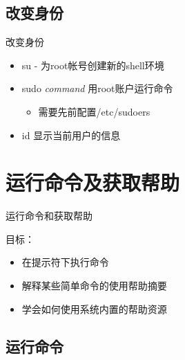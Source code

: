 \subsection{改变身份}


\begin{frame}{改变身份}
\begin{itemize}
\item su - 为root帐号创建新的shell环境
\item sudo \emph{command} 用root账户运行命令

\begin{itemize}
\item 需要先前配置/etc/sudoers
\end{itemize}
\item id 显示当前用户的信息
\end{itemize}

\end{frame}

\section{运行命令及获取帮助}


\begin{frame}{运行命令和获取帮助}

目标：
\begin{itemize}
\item 在提示符下执行命令
\item 解释某些简单命令的使用帮助摘要
\item 学会如何使用系统内置的帮助资源
\end{itemize}

\end{frame}

\subsection{运行命令}


